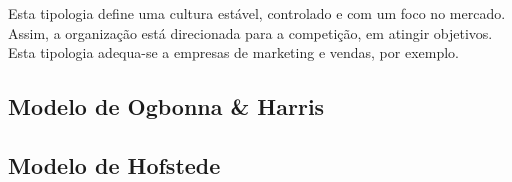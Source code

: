 Esta tipologia define uma cultura estável, controlado e com um foco no mercado. Assim, a organização está direcionada para a competição, em atingir objetivos. Esta tipologia adequa-se a empresas de marketing e vendas, por exemplo.

\subsection{Modelo de Ogbonna \& Harris}

\subsection{Modelo de Hofstede}


